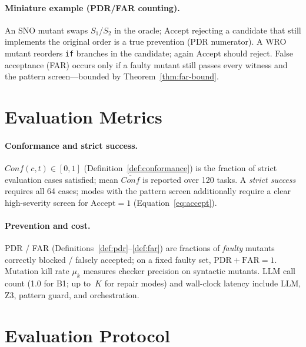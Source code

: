 \paragraph{Miniature example (PDR/FAR counting).}
An SNO mutant swaps $S_1$/$S_2$ in the oracle; $\mathrm{Accept}$ rejecting a
candidate that still implements the original order is a true prevention
(PDR numerator).
A WRO mutant reorders \texttt{if} branches in the candidate; again
$\mathrm{Accept}$ should reject.
False acceptance (FAR) occurs only if a faulty mutant still passes every
witness and the pattern screen---bounded by Theorem~\ref{thm:far-bound}.

\section{Evaluation Metrics}
\label{sec:exp:metrics}

\paragraph{Conformance and strict success.}
$\mathit{Conf}(c,t)\in[0,1]$ (Definition~\ref{def:conformance}) is the fraction
of strict evaluation cases satisfied; mean $\overline{\mathit{Conf}}$ is
reported over 120 tasks.
A \emph{strict success} requires all 64  cases;
modes with the pattern screen additionally require a clear high-severity
screen for $\mathrm{Accept}{=}1$ (Equation~\eqref{eq:accept}).

\paragraph{Prevention and cost.}
PDR / FAR (Definitions~\ref{def:pdr}--\ref{def:far}) are fractions of
\emph{faulty} mutants correctly blocked / falsely accepted;
on a fixed faulty set, $\mathrm{PDR}+\mathrm{FAR}=1$.
Mutation kill rate $\mu_k$ measures checker precision on syntactic mutants.
LLM call count (1.0 for B1; up to~$K$ for repair modes) and wall-clock
latency include LLM, Z3, pattern guard, and orchestration.

\section{Evaluation Protocol}
\label{sec:exp:eval-protocol}

